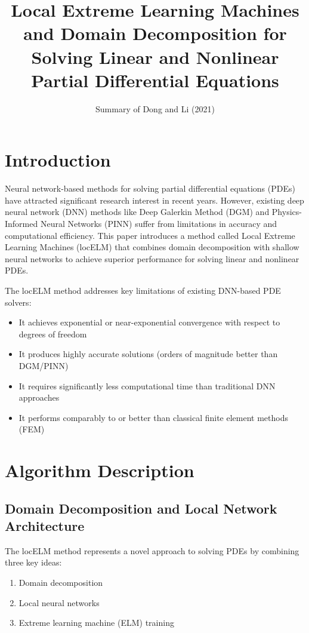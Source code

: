 \documentclass[11pt,a4paper]{article}
\title{Local Extreme Learning Machines and Domain Decomposition for Solving Linear and Nonlinear Partial Differential Equations}
\author{Summary of Dong and Li (2021)}
\date{}
\begin{document}
\maketitle

\section{Introduction}
Neural network-based methods for solving partial differential equations (PDEs) have attracted significant research interest in recent years. However, existing deep neural network (DNN) methods like Deep Galerkin Method (DGM) and Physics-Informed Neural Networks (PINN) suffer from limitations in accuracy and computational efficiency. This paper introduces a method called Local Extreme Learning Machines (locELM) that combines domain decomposition with shallow neural networks to achieve superior performance for solving linear and nonlinear PDEs.

The locELM method addresses key limitations of existing DNN-based PDE solvers:
\begin{itemize}
    \item It achieves exponential or near-exponential convergence with respect to degrees of freedom
    \item It produces highly accurate solutions (orders of magnitude better than DGM/PINN)
    \item It requires significantly less computational time than traditional DNN approaches
    \item It performs comparably to or better than classical finite element methods (FEM)
\end{itemize}

\section{Algorithm Description}

\subsection{Domain Decomposition and Local Network Architecture}
The locELM method represents a novel approach to solving PDEs by combining three key ideas:
\begin{enumerate}
    \item Domain decomposition
    \item Local neural networks
    \item Extreme learning machine (ELM) training
\end{enumerate}
\end{document}
